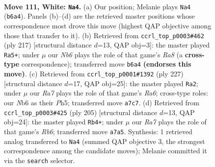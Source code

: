 \documentclass[11pt]{article}
\begin{document}
\clearpage

\begin{figure}[p]\centering
\begin{subfigure}{0.46\textwidth}\centering
\resizebox{\linewidth}{!}{%
\newchessgame
\chessboard[
  setfen={8/R5p1/1N3pk1/7p/7P/6PK/4r3/8 w - - 46 111},
  showmover=false,
  pgfstyle=straightmove, color=movearrow, markmove={b6-a4}
]}
\caption{}
\end{subfigure}\hfill
\begin{subfigure}{0.46\textwidth}\centering
\resizebox{\linewidth}{!}{%
\newchessgame
\chessboard[
  setfen={8/5pk1/7p/5K1P/5PP1/1R6/8/r7 b - - 24 109},
  showmover=false,
  pgfstyle=straightmove, color=movearrow, markmove={a1-a5}
]}
\caption{}
\end{subfigure}
\\[4pt]
\begin{subfigure}{0.46\textwidth}\centering
\resizebox{\linewidth}{!}{%
\newchessgame
\chessboard[
  setfen={1R6/6k1/6p1/5p1p/7P/r5P1/5PK1/8 b - - 5 114},
  showmover=false,
  pgfstyle=straightmove, color=movearrow, markmove={a3-a2}
]}
\caption{}
\end{subfigure}\hfill
\begin{subfigure}{0.46\textwidth}\centering
\resizebox{\linewidth}{!}{%
\newchessgame
\chessboard[
  setfen={8/5pk1/R6p/5P2/5KP1/1r3P2/8/8 b - - 92 103},
  showmover=false,
  pgfstyle=straightmove, color=movearrow, markmove={b3-b4}
]}
\caption{}
\end{subfigure}
\caption{\textbf{Move 111, White: \texttt{Na4}.} (a) Our position; Melanie plays \texttt{Na4} (\texttt{b6a4}). Panels (b)--(d) are the retrieved master positions whose correspondence most drove this move (highest QAP objective among those that transfer to it). (b) Retrieved from \texttt{ccrl\_top\_p0003\#462} (ply 217) [structural distance $d$=13, QAP obj=3]: the master played \texttt{Ra5+}; under $\mu$ our \emph{Nb6} plays the role of that game's \emph{Ra8} (a \textbf{cross-type} correspondence); transferred move \texttt{b6a4} \textbf{(endorses this move)}. (c) Retrieved from \texttt{ccrl\_top\_p0001\#1392} (ply 227) [structural distance $d$=17, QAP obj=25]: the master played \texttt{Ra2}; under $\mu$ our \emph{Ra7} plays the role of that game's \emph{Ra6}; cross-type roles: our \emph{N}b6 as their \emph{P}h5; transferred move \texttt{a7c7}. (d) Retrieved from \texttt{ccrl\_top\_p0003\#425} (ply 205) [structural distance $d$=13, QAP obj=24]: the master played \texttt{Rb4+}; under $\mu$ our \emph{Ra7} plays the role of that game's \emph{Rb6}; transferred move \texttt{a7a5}. Synthesis: 1 retrieved analog transferred to \texttt{Na4} (summed QAP objective 3, the strongest correspondence among the candidate moves); Melanie committed it via the \texttt{search} selector.}
\label{fig:thought-m220}
\end{figure}
\end{document}
